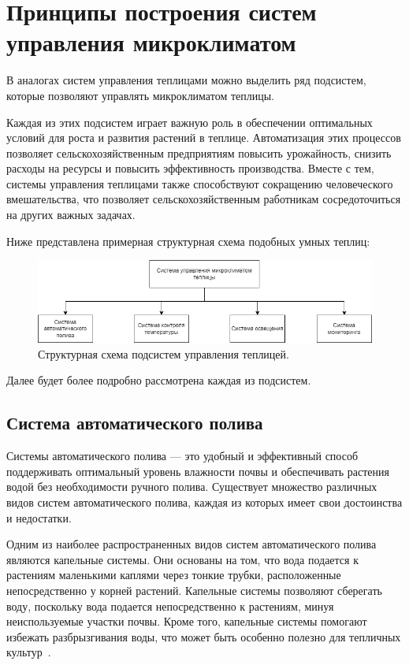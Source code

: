 \chapter{Принципы построения систем управления микроклиматом}

В аналогах систем управления теплицами можно выделить ряд подсистем, которые позволяют управлять микроклиматом теплицы.

Каждая из этих подсистем играет важную роль в обеспечении оптимальных условий для роста и развития растений в теплице. Автоматизация этих процессов позволяет сельскохозяйственным предприятиям повысить урожайность, снизить расходы на ресурсы и повысить эффективность производства. Вместе с тем, системы управления теплицами также способствуют сокращению человеческого вмешательства, что позволяет сельскохозяйственным работникам сосредоточиться на других важных задачах.

Ниже представлена примерная структурная схема подобных умных теплиц:

\begin{figure}[H]
    \centering
    \includegraphics[scale=0.6]{images/system_schem.png}
    \caption{Структурная схема подсистем управления теплицей.}
    \label{fig:system_schem}
\end{figure}

Далее будет более подробно рассмотрена каждая из подсистем.

\section{Система автоматического полива}

Системы автоматического полива --- это удобный и эффективный способ поддерживать оптимальный уровень влажности почвы и обеспечивать растения водой без необходимости ручного полива. Существует множество различных видов систем автоматического полива, каждая из которых имеет свои достоинства и недостатки.

Одним из наиболее распространенных видов систем автоматического полива являются капельные системы. Они основаны на том, что вода подается к растениям маленькими каплями через тонкие трубки, расположенные непосредственно у корней растений. Капельные системы позволяют сберегать воду, поскольку вода подается непосредственно к растениям, минуя неиспользуемые участки почвы. Кроме того, капельные системы помогают избежать разбрызгивания воды, что может быть особенно полезно для тепличных культур~\cite{Watering,Watering2}.

